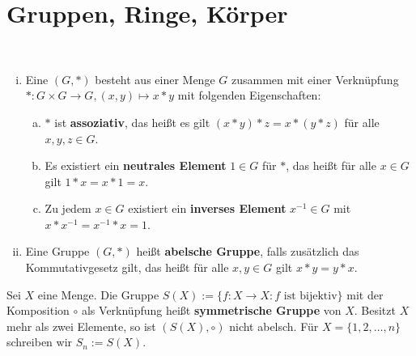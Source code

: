\section{Gruppen, Ringe, Körper}
\begin{definition}[Gruppe]
	\label{def:I.4.1}
	\mbox{} \\[-1.4cm]
	\begin{enumerate}[(i)]
		\item Eine  $(G,*)$ besteht aus einer Menge $G$ zusammen mit einer Verknüpfung $*\colon G \times G \rightarrow G, (x,y) \mapsto x*y$ mit folgenden Eigenschaften:
		\begin{enumerate}[a)]
			\item $*$ ist \textbf{assoziativ}, das heißt es gilt $(x*y)*z = x * (y*z)$ für alle $x,y,z \in G$. 
			\item Es existiert ein \textbf{neutrales Element} $1 \in G$ für $*$, das heißt für alle $x \in G$ gilt $1 * x = x * 1 = x$. 
			\item Zu jedem $x \in G$ existiert ein \textbf{inverses Element} $x^{-1} \in G$ mit $x * x^{-1} = x^{-1} * x = 1$. 
		\end{enumerate}
		\item Eine Gruppe $(G,*)$ heißt \textbf{abelsche Gruppe}, falls zusätzlich das Kommutativgesetz gilt, das heißt für alle $x,y \in G$ gilt $x*y = y*x$. 
	\end{enumerate}
\end{definition}

\setcounter{definition}{3}
\begin{beispiel}
	\label{bsp:I.4.4}
	Sei $X$ eine Menge. Die Gruppe $S(X) := \{f \colon X \rightarrow X : f \text{ ist bijektiv}\}$ mit der Komposition $\circ$ als Verknüpfung heißt \textbf{symmetrische Gruppe} von $X$.
	Besitzt $X$ mehr als zwei Elemente, so ist $(S(X),\circ)$ nicht abelsch. Für $X = \{1,2,\dots,n\}$ schreiben wir $S_n := S(X)$. 
\end{beispiel}


